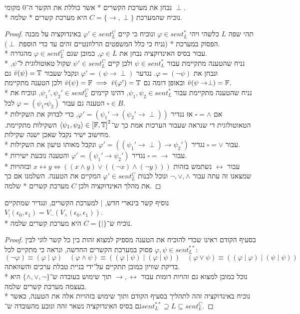 \Subquestion{}
נבחן את מערכת הקשרים $*$ אשר כוללת את הקשר ה־$0$ מקומי $\perp$. \\*
נוכיח שהמערכת $C = \{ \to, \perp \}$ היא מערכת קשרים $*$ שלמה.
\begin{proof}
	תהי שפה $L$ כלשהי ויהי $\varphi \in sent_L^*$ ונוכיח כי קיים $\varphi' \in sent_L^C$ באינדוקציה על מבנה הפסוק במערכת $*$ (נניח כי כלל המשפטים הרלוונטיים זהים עד כדי הוספת $\perp$). \\*
	עבור בסיס האינדוקציה נבחן את $\varphi \in L$, כמובן שגם $\varphi \in sent_L^C$ מהגדרה. \\*
	נניח שהטענה מתקיימת עבור $\psi \in sent_L^*$ ולכן קיים $\psi' \in sent_L^C$ שקול טאוטולוגית ל־$\psi$, ונבחן את $\varphi = (\lnot \psi)$.
	נגדער $\varphi' = (\psi \to \perp)$ ונקבל שעבור $\bar{v}(\psi) = \mathbb{T}$ גם $\bar{v}(\psi \to \perp) = \mathbb{F}$ ובאופן דומה גם $\bar{v}(\psi) = \mathbb{F} \implies \bar{v}(\varphi') = \mathbb{T}$ ולכן הטענה מתקיימת. \\*
	נניח שהטענה מתקיימת עבור $\psi_1, \psi_2 \in sent_L^*$, דהינו קיימים $\psi_1', \psi_2' \in sent_L^C$, ונוכיח את הטענה גם עבור $\varphi = (\psi_1 \square \psi_2)$ לכל $\square \in B$. \\*
	אם $\square = \land$ אז נגדיר $\varphi' = (\psi_1' \to (\psi_2' \to \perp))$, כדי לבדוק את השקילות הטאוטולוגית די שנראה שעבור הערכות אמת כך ש־$\langle \psi_1, \psi_2 \rangle \in {[\mathbb{F}, \mathbb{T}]}^2$ השקילות מתקיימת.
	מחישוב ישיר נקבל שאכן ישנה שקילות. \\*
	עבור $\square = \lor$ נגדיר $\varphi' = ((\psi_1' \to \perp) \to \psi_2')$ ונקבל מאותו טיעון את השקילות. \\*
	עבור $\square = \to$ נגדיר $\varphi' = (\psi_1' \to \psi_2')$ והטענה נובעת ישירות. \\*
	עבור $\leftrightarrow$ נשתמש בזהות $x \leftrightarrow y \iff ((x \land y) \lor ((\lnot x) \land (\lnot y)))$ ובזהויות שמצאנו זה עתה עבור $\lnot, \lor, \land$ ונוכל לבנות $\varphi' \in sent_L^C$ המקיים את הטענה.
	השלמנו אם כך את מהלך האינדוקציה ולכן $C$ מערכת קשרים $*$ שלמה.
\end{proof}

\Subquestion{}
נוסיף קשר בינארי חדש, $\mid$ למערכת הקשרים, ונגדיר שמתקיים $V_\mid(\epsilon_0, \epsilon_1) = V_\lnot(V_\land(\epsilon_0, \epsilon_1))$. \\*
נוכיח ש־$C = \{ \mid \}$ היא מערכת קשרים שלמה.
\begin{proof}
	בסעיף הקודם ראינו שכדי להוכיח את הטענה מספיק למצוא זהות בין כל קשר לוגי לבין פסוק במערכת הקשרים החדשה, ונראה כי מתקיים לכל $\varphi, \psi \in sent_L^{**}$:
	\[
		(\lnot \varphi) \equiv (\varphi \mid \varphi)
		\quad
		(\varphi \land \psi) \equiv ((\varphi \mid \psi) \mid (\varphi \mid \psi))
		\quad
		(\varphi \lor \psi) \equiv ((\varphi \mid \varphi) \mid (\psi \mid \psi))
	\]
	בדיקת שוויון כמובן תתקיים על־ידי בניית טבלת ערכים והשוואתה. \\*
	נוכל כמובן למצוא גם זהויות דומות עבור $\to, \leftrightarrow$ תוך שימוש בעובדה ש־$\{ \land, \lor, \lnot \}$ היא בעצמה מערכת קשרים שלמה. \\*
	נוכיח באינדוקציה זהה לתהליך בסעיף הקודם ותוך שימוש בזהויות אלה את הטענה, כאשר גם בסיס האינדוקציה נשאר זהה ונובע מהעובדה ש־$sent_L^{**} \supseteq L \subseteq sent_L^C$.
\end{proof}

